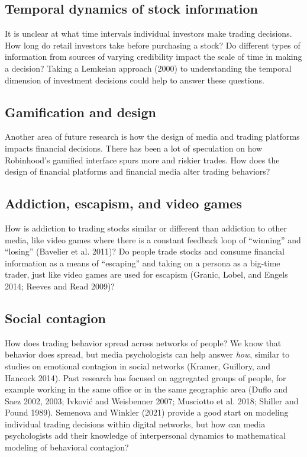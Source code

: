 \documentclass[12pt,]{article}
\begin{document}
\hypertarget{temporal-dynamics-of-stock-information}{%
\subsection{Temporal dynamics of stock
information}\label{temporal-dynamics-of-stock-information}}

It is unclear at what time intervals individual investors make trading
decisions. How long do retail investors take before purchasing a stock?
Do different types of information from sources of varying credibility
impact the scale of time in making a decision? Taking a Lemkeian
approach (2000) to understanding the temporal dimension of investment
decisions could help to answer these questions.

\hypertarget{gamification-and-design}{%
\subsection{Gamification and design}\label{gamification-and-design}}

Another area of future research is how the design of media and trading
platforms impacts financial decisions. There has been a lot of
speculation on how Robinhood's gamified interface spurs more and riskier
trades. How does the design of financial platforms and financial media
alter trading behaviors?

\hypertarget{addiction-escapism-and-video-games}{%
\subsection{Addiction, escapism, and video
games}\label{addiction-escapism-and-video-games}}

How is addiction to trading stocks similar or different than addiction
to other media, like video games where there is a constant feedback loop
of ``winning'' and ``losing'' (Bavelier et al. 2011)? Do people trade
stocks and consume financial information as a means of ``escaping'' and
taking on a persona as a big-time trader, just like video games are used
for escapism (Granic, Lobel, and Engels 2014; Reeves and Read 2009)?

\hypertarget{social-contagion}{%
\subsection{Social contagion}\label{social-contagion}}

How does trading behavior spread across networks of people? We know that
behavior does spread, but media psychologists can help answer
\emph{how}, similar to studies on emotional contagion in social networks
(Kramer, Guillory, and Hancock 2014). Past research has focused on
aggregated groups of people, for example working in the same office or
in the same geographic area (Duflo and Saez 2002, 2003; Ivković and
Weisbenner 2007; Musciotto et al. 2018; Shiller and Pound 1989).
Semenova and Winkler (2021) provide a good start on modeling individual
trading decisions within digital networks, but how can media
psychologists add their knowledge of interpersonal dynamics to
mathematical modeling of behavioral contagion?
\end{document}
